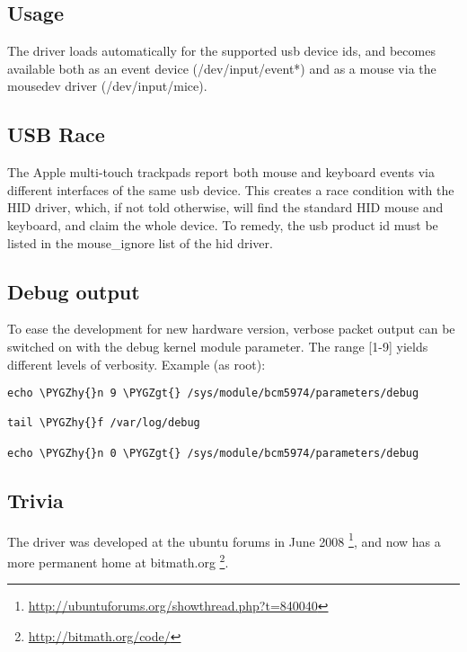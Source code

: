 \documentclass[a4paper,8pt,english]{sphinxmanual}
\def\PYGZgt{\char`\>}
\def\PYGZhy{\char`\-}
\begin{document}
\subsection{Usage}
\label{input/devices/bcm5974:usage}
The driver loads automatically for the supported usb device ids, and
becomes available both as an event device (/dev/input/event*) and as a
mouse via the mousedev driver (/dev/input/mice).


\subsection{USB Race}
\label{input/devices/bcm5974:usb-race}
The Apple multi-touch trackpads report both mouse and keyboard events via
different interfaces of the same usb device. This creates a race condition
with the HID driver, which, if not told otherwise, will find the standard
HID mouse and keyboard, and claim the whole device. To remedy, the usb
product id must be listed in the mouse\_ignore list of the hid driver.


\subsection{Debug output}
\label{input/devices/bcm5974:debug-output}
To ease the development for new hardware version, verbose packet output can
be switched on with the debug kernel module parameter. The range {[}1-9{]}
yields different levels of verbosity. Example (as root):

\begin{Verbatim}[commandchars=\\\{\}]
echo \PYGZhy{}n 9 \PYGZgt{} /sys/module/bcm5974/parameters/debug

tail \PYGZhy{}f /var/log/debug

echo \PYGZhy{}n 0 \PYGZgt{} /sys/module/bcm5974/parameters/debug
\end{Verbatim}


\subsection{Trivia}
\label{input/devices/bcm5974:trivia}
The driver was developed at the ubuntu forums in June 2008 \footnote[1]{
\href{http://ubuntuforums.org/showthread.php?t=840040}{http://ubuntuforums.org/showthread.php?t=840040}
}, and now has
a more permanent home at bitmath.org \footnote[2]{
\href{http://bitmath.org/code/}{http://bitmath.org/code/}
}.
\end{document}
